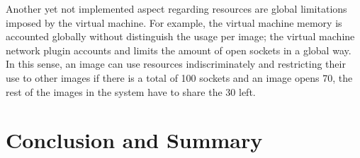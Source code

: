 Another yet not implemented aspect regarding resources are global limitations imposed by the virtual machine. For example, the virtual machine memory is accounted globally without distinguish the usage per image; the virtual machine network plugin accounts and limits the amount of open sockets in a global way. In this sense, an image can use resources indiscriminately and restricting their use to other images \ie if there is a total of 100 sockets and an image opens 70, the rest of the images in the system have to share the 30 left.  

\section{Conclusion and Summary}


